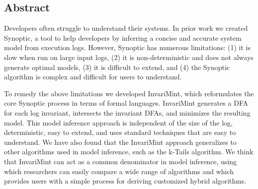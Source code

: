 \subsection*{Abstract}
Developers often struggle to understand their systems. In prior work
we created Synoptic, a tool to help developers 
by inferring a concise and accurate system model from execution logs.
However, Synoptic has numerous limitations: (1) it is slow when run on
large input logs, (2) it is non-deterministic and does not always generate
optimal models, (3) it is difficult to extend, and (4) the Synoptic algorithm is complex and
difficult for users to understand.

To remedy the above limitations we developed InvariMint,
which reformulates the core Synoptic process in terms of formal
languages. InvariMint generates a DFA for each log invariant, intersects the 
invariant DFAs, and minimizes the resulting model.
This model inference approach is independent of the size of the log,
deterministic, easy to extend, and uses standard techniques that are easy
to understand. We have also found that the InvariMint approach generalizes
to other algorithms used in model inference, such as the k-Tails algorithm.
We think that InvariMint can act as a common denominator in model
inference, using which researchers can easily compare a wide range of
algorithms and which provides users with a simple process for deriving
customized hybrid algorithms.
